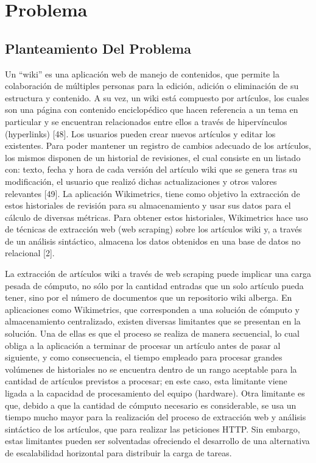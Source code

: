 \section{Problema}

\subsection{Planteamiento Del Problema}

Un “wiki” es una aplicación web de manejo de contenidos, que permite la
colaboración de múltiples personas para la edición, adición o eliminación de su
estructura y contenido. A su vez, un wiki está compuesto por artículos, los cuales son
una página con contenido enciclopédico que hacen referencia a un tema en particular y
se encuentran relacionados entre ellos a través de hipervínculos (hyperlinks) [48]. Los
usuarios pueden crear nuevos artículos y editar los existentes. Para poder mantener un
registro de cambios adecuado de los artículos, los mismos disponen de un historial de
revisiones, el cual consiste en un listado con: texto, fecha y hora de cada versión del
artículo wiki que se genera tras su modificación, el usuario que realizó dichas
actualizaciones y otros valores relevantes [49].
La aplicación Wikimetrics, tiene como objetivo la extracción de estos historiales de
revisión para su almacenamiento y usar sus datos para el cálculo de diversas métricas.
Para obtener estos historiales, Wikimetrics hace uso de técnicas de extracción web (web
scraping) sobre los artículos wiki y, a través de un análisis sintáctico, almacena los datos
obtenidos en una base de datos no relacional [2].

La extracción de artículos wiki a través de web scraping puede implicar una carga
pesada de cómputo, no sólo por la cantidad entradas que un solo artículo pueda tener,
sino por el número de documentos que un repositorio wiki alberga. En aplicaciones
como Wikimetrics, que corresponden a una solución de cómputo y almacenamiento
centralizado, existen diversas limitantes que se presentan en la solución. Una de ellas es
que el proceso se realiza de manera secuencial, lo cual obliga a la aplicación a terminar
de procesar un artículo antes de pasar al siguiente, y como consecuencia, el tiempo
empleado para procesar grandes volúmenes de historiales no se encuentra dentro de un
rango aceptable para la cantidad de artículos previstos a procesar; en este caso, esta
limitante viene ligada a la capacidad de procesamiento del equipo (hardware). Otra
limitante es que, debido a que la cantidad de cómputo necesario es considerable, se usa
un tiempo mucho mayor para la realización del proceso de extracción web y análisis
sintáctico de los artículos, que para realizar las peticiones HTTP. Sin embargo, estas
limitantes pueden ser solventadas ofreciendo el desarrollo de una alternativa de
escalabilidad horizontal para distribuir la carga de tareas.

